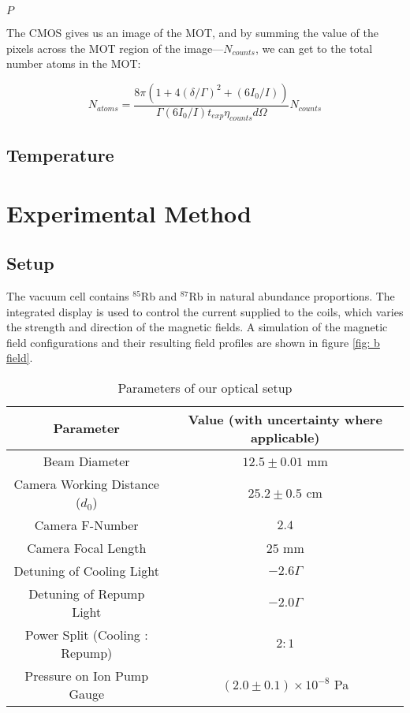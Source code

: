 \documentclass[12pt,twoside]{article}
\begin{document}
$P$

The CMOS gives us an image of the MOT, and by summing the value of the pixels across the MOT region of the image---$N_{counts}$, we can get to the total number atoms in the MOT:

\begin{equation}
N_{atoms}=\frac{8\pi(1+4(\delta/\Gamma)^{2}+(6I_{0}/I))}{\Gamma(6I_{0}/I)t_{exp}\eta_{counts}d\Omega}N_{counts} \label{eqn: n atoms}
\end{equation}

\section{Temperature}

\chapter{Experimental Method}
\section{Setup}
The vacuum cell contains $^{85}$Rb and $^{87}$Rb in natural abundance proportions. The integrated display is used to control the current supplied to the coils, which varies the strength and direction of the magnetic fields. A simulation of the magnetic field configurations and their resulting field profiles are shown in figure \ref{fig: b field}.

\begin{table}[h!]
  \captionsetup{font=footnotesize}
\begin{center}      
\begin{tabular}{c | c }
\textbf{Parameter} & \textbf{Value (with uncertainty where applicable) } \\
\hline
Beam Diameter & $12.5 \pm 0.01$ mm\\
Camera Working Distance ($d_0$) & $25.2 \pm 0.5$ cm\\
Camera F-Number & $2.4$\\
Camera Focal Length & $25$ mm\\
Detuning of Cooling Light & $-2.6\Gamma$ \\
Detuning of Repump Light & $-2.0\Gamma$ \\
Power Split (Cooling : Repump) & $2:1$\\
Pressure on Ion Pump Gauge & $\left(2.0\pm0.1\right)\times10^{-8}$ Pa\\
\end{tabular}
\newline \caption{Parameters of our optical setup}
\label{table:selection rules}
\end{center}
\vspace{-20pt}
\end{table}
\end{document}
